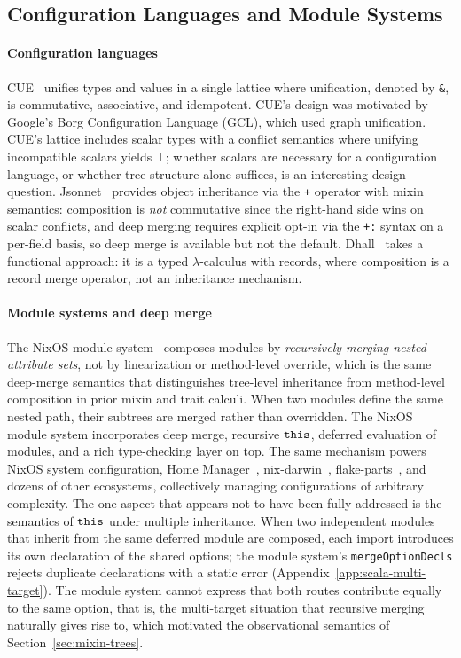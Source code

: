 \subsection{Configuration Languages and Module Systems}

\paragraph{Configuration languages}
CUE~\cite{cue2019} unifies types and values in a single lattice
where unification, denoted by \texttt{\&}, is commutative, associative, and
idempotent.
CUE's design was motivated by Google's Borg Configuration
Language (GCL), which used graph unification.
CUE's lattice includes scalar types with a conflict
semantics where unifying incompatible scalars yields $\bot$; whether
scalars are necessary for a configuration language, or whether
tree structure alone suffices, is an interesting design question.
Jsonnet~\cite{jsonnet} provides object inheritance via the
\texttt{+} operator with mixin semantics: composition is
\emph{not} commutative since the right-hand side wins on scalar
conflicts, and deep merging requires explicit opt-in via the \texttt{+:}
syntax on a per-field basis, so deep merge is
available but not the default.
Dhall~\cite{dhall2017} takes a functional approach: it is a typed
$\lambda$-calculus with records, where composition is a record merge
operator, not an inheritance mechanism.

\paragraph{Module systems and deep merge}
The NixOS module system~\cite{dolstra2010-nixos,nixosmodules}
composes modules by \emph{recursively merging nested attribute sets},
not by linearization or method-level override, which is the same deep-merge
semantics that distinguishes tree-level inheritance from method-level
composition in prior mixin and trait calculi.
When two modules define the same nested path, their subtrees are
merged rather than overridden.
The NixOS module system incorporates deep merge,
recursive $\mathtt{this}$, deferred evaluation of modules, and a
rich type-checking layer on top.
The same mechanism powers
NixOS system configuration, Home
Manager~\cite{homemanager}, nix-darwin~\cite{nixdarwin},
flake-parts~\cite{flakeparts}, and dozens of other ecosystems,
collectively managing configurations of arbitrary complexity.
The one aspect that appears not to have been fully addressed is the
semantics of $\mathtt{this}$ under multiple inheritance.
When two independent modules that inherit from the same
deferred module are composed, each import introduces its own
declaration of the shared options; the module system's
\texttt{merge\-Option\-Decls} rejects duplicate declarations
with a static error (Appendix~\ref{app:scala-multi-target}).
The module system cannot express that both routes contribute
equally to the same option, that is, the multi-target situation that
recursive merging naturally gives rise to, which motivated the
observational semantics of Section~\ref{sec:mixin-trees}.

